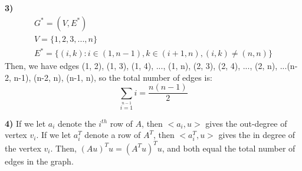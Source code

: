\documentclass[10pt]{article}
\begin{document}
\noindent\textbf{3)}\\
\begin{gather*}
G^* = (V, E^*)\\
V = \{1, 2, 3, . . . , n\}\\
E^* = \{(i, k):i\in(1, n-1), k\in(i+1, n), (i,k)\ne(n, n)\}
\end{gather*}
Then, we have edges (1, 2), (1, 3), (1, 4), ..., (1, n), (2, 3), (2, 4), ..., (2, n), ...(n-2, n-1), (n-2, n), (n-1, n), so the total number of edges is:
\begin{displaymath}
	\sum\limits_{i = 1}\limits^{n-1} i = \frac{n(n-1)}2
\end{displaymath}

\noindent\textbf{4) }
If we let $a_i$ denote the $i^{th}$ row of $A$, then $<a_i, u>$ gives the out-degree of vertex $v_i$. If we let $a_i^T$ denote a row of $A^T$, then $<a_i^T, u>$ gives the in degree of the vertex $v_i$. Then,  $(Au)^Tu = (A^Tu)^Tu$, and both equal the total number of edges in the graph.
\end{document}
